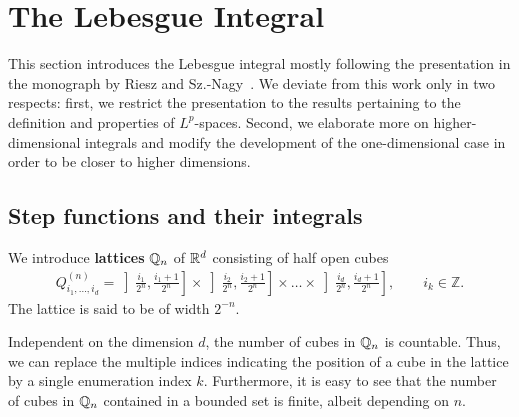 
\section{The Lebesgue Integral}
\label{sec:lebesgue-integral}
\begin{intro}
  This section introduces the Lebesgue integral mostly following the
  presentation in the monograph by Riesz and
  Sz.-Nagy~\cite{RieszNagy}. We deviate from this work only in two
  respects: first, we restrict the presentation to the results
  pertaining to the definition and properties of $L^p$-spaces. Second,
  we elaborate more on higher-dimensional integrals and modify the
  development of the one-dimensional case in order to be closer to
  higher dimensions.
\end{intro}

\subsection{Step functions and their integrals}

\begin{definition}
  We introduce \textbf{lattices} $\mathbb Q_n$ of $\mathbb R^d$ consisting of half
  open cubes
  \begin{gather*}
    Q^{(n)}_{i_1,\dots,i_d} =
    \left]\tfrac{i_1}{2^n},\tfrac{i_1+1}{2^n}\right]
    \times
    \left]\tfrac{i_2}{2^n},\tfrac{i_2+1}{2^n}\right]
    \times\dots\times
    \left]\tfrac{i_d}{2^n},\tfrac{i_d+1}{2^n}\right],
    \qquad i_k\in\mathbb Z.
  \end{gather*}
  The lattice is said to be of width $2^{-n}$.
\end{definition}

\begin{note}
  Independent on the dimension $d$, the number of cubes in $\mathbb Q_n$ is
  countable. Thus, we can replace the multiple indices indicating the
  position of a cube in the lattice by a single enumeration index
  $k$. Furthermore, it is easy to see that the number of cubes in
  $\mathbb Q_n$ contained in a bounded set is finite, albeit depending on $n$.
\end{note}

